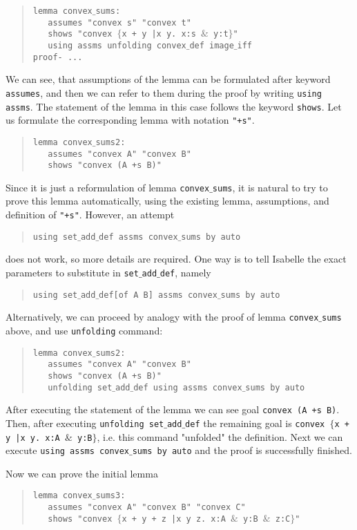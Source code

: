 \documentclass[11pt]{article}
\newcommand{\inds}{\phantom{a}\,\,\,}
\newcommand{\prog}[1]{\par\noindent\begin{quote}#1\end{quote}\par\noindent}
\begin{document}
\prog{\tt lemma convex$\_$sums:\\
    \inds assumes "convex s" "convex t"\\
    \inds shows "convex $\{$x + y |x y.~x:s $\&$ y:t$\}$"\\
    \inds using assms unfolding convex$\_$def image$\_$iff\\
    proof- ... }%

We can see, that assumptions of the lemma can be formulated after keyword {\tt assumes}, and then we can refer to them during the proof by writing {\tt using assms}. The statement of the lemma in this case follows the keyword {\tt shows}. Let us formulate the corresponding lemma with notation {\tt "+s"}.

\prog{\tt lemma convex$\_$sums2:\\
    \inds assumes "convex A" "convex B"\\
    \inds shows "convex (A +s B)"}%

Since it is just a reformulation of lemma {\tt convex$\_$sums}, it is natural to try to prove this lemma automatically, using the existing lemma, assumptions, and definition of {\tt "+s"}. However, an attempt

\prog{\tt using set$\_$add$\_$def assms convex$\_$sums by auto}%
does not work, so more details are required. One way is to tell Isabelle the exact parameters to substitute in {\tt set$\_$add$\_$def}, namely

\prog{\tt using set$\_$add$\_$def[of A B] assms convex$\_$sums by auto}%

Alternatively, we can proceed by analogy with the proof of lemma {\tt convex$\_$sums} above, and use {\tt unfolding} command:

\prog{\tt lemma convex$\_$sums2:\\
    \inds assumes "convex A" "convex B"\\
    \inds shows "convex (A +s B)"\\
    \inds unfolding set$\_$add$\_$def using assms convex$\_$sums by auto}%

After executing the statement of the lemma we can see goal {\tt convex (A +s B)}. Then, after executing {\tt unfolding set$\_$add$\_$def} the remaining goal is {\tt convex $\{$x + y |x y.~x:A $\&$ y:B$\}$}, i.e. this command "unfolded" the definition. Next we can execute {\tt using assms convex$\_$sums by auto} and the proof is successfully finished.

Now we can prove the initial lemma

\prog{\tt lemma convex$\_$sums3:\\
    \inds assumes "convex A" "convex B" "convex C"\\
    \inds shows "convex $\{$x + y + z |x y z.~x:A $\&$ y:B $\&$ z:C$\}$"\\}%
\end{document}
